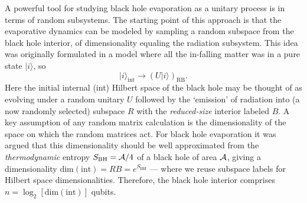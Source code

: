 \documentclass[twocolumn,aps,prl,amsmath,amssymb,floatfix]{revtex4}
\begin{document}
A powerful tool for studying black hole evaporation as a unitary process
is in terms of random subsystems. The starting point of this approach is
that the evaporative dynamics can be modeled by sampling a random 
subspace from the black hole interior, of dimensionality equaling 
the radiation subsystem. This idea was originally formulated \cite{Page93}
in a model where all the in-falling matter was in a pure state
$|i\rangle$, so 
\begin{equation}
|i\rangle_{\text{int}}\rightarrow (U|i\rangle)_{\text{RB}}. \label{Page}
\end{equation}
Here the initial internal (int) Hilbert space of the black hole may
be thought of as evolving under a random unitary $U$ followed by
the `emission' of radiation into (a now randomly selected) subspace $R$
with the {\it reduced-size\/} interior labeled $B$. A key assumption
of any random matrix calculation is the dimensionality of the space 
on which the random matrices act. For black hole evaporation it was
argued \cite{Page93} that this dimensionality should be well
approximated from the {\it thermodynamic\/} entropy
$S_{\text{BH}}={\cal A}/4$ of a black hole of area ${\cal A}$, 
giving a dimensionality
$\text{dim}(\text{int})= R B= e^{S_{\text{BH}}}$ --- where we reuse
subspace labels for Hilbert space dimensionalities. Therefore,
the black hole interior comprises $n=\log_2[\text{dim}(\text{int})]$
qubits.
\end{document}
